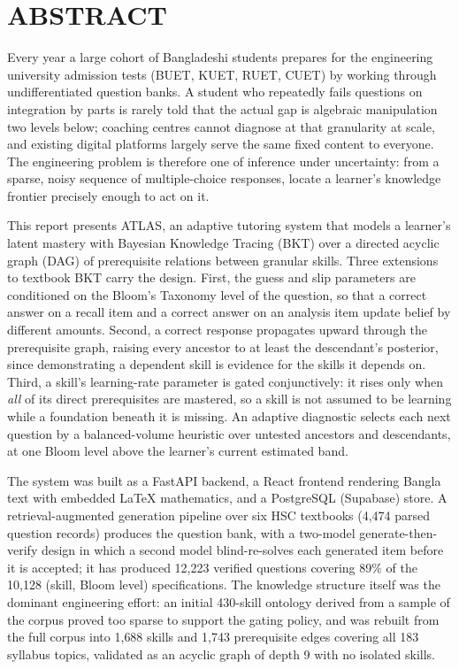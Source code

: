 \chapter*{ABSTRACT}
\begingroup
\small
\setlength{\parskip}{1.5mm}

Every year a large cohort of Bangladeshi students prepares for the engineering
university admission tests (BUET, KUET, RUET, CUET) by working through
undifferentiated question banks. A student who repeatedly fails questions on
integration by parts is rarely told that the actual gap is algebraic
manipulation two levels below; coaching centres cannot diagnose at that
granularity at scale, and existing digital platforms largely serve the same
fixed content to everyone. The engineering problem is therefore one of
inference under uncertainty: from a sparse, noisy sequence of multiple-choice
responses, locate a learner's knowledge frontier precisely enough to act on it.

This report presents ATLAS, an adaptive tutoring system that models a learner's
latent mastery with Bayesian Knowledge Tracing (BKT) over a directed acyclic
graph (DAG) of prerequisite relations between granular skills. Three extensions
to textbook BKT carry the design. First, the guess and slip parameters are
conditioned on the Bloom's Taxonomy level of the question, so that a correct
answer on a recall item and a correct answer on an analysis item update belief
by different amounts. Second, a correct response propagates upward through the
prerequisite graph, raising every ancestor to at least the descendant's
posterior, since demonstrating a dependent skill is evidence for the skills it
depends on. Third, a skill's learning-rate parameter is gated conjunctively:
it rises only when \emph{all} of its direct prerequisites are mastered, so a
skill is not assumed to be learning while a foundation beneath it is missing.
An adaptive diagnostic selects each next question by a balanced-volume
heuristic over untested ancestors and descendants, at one Bloom level above the
learner's current estimated band.

The system was built as a FastAPI backend, a React frontend rendering Bangla
text with embedded \LaTeX{} mathematics, and a PostgreSQL (Supabase) store. A
retrieval-augmented generation pipeline over six HSC textbooks (4{,}474 parsed
question records) produces the question bank, with a two-model
generate-then-verify design in which a second model blind-re-solves each
generated item before it is accepted; it has produced 12{,}223 verified questions
covering 89\% of the 10{,}128 (skill, Bloom level) specifications. The knowledge structure itself was the
dominant engineering effort: an initial 430-skill ontology derived from a
sample of the corpus proved too sparse to support the gating policy, and was
rebuilt from the full corpus into 1{,}688 skills and 1{,}743 prerequisite edges
covering all 183 syllabus topics, validated as an acyclic graph of depth 9 with
no isolated skills.

